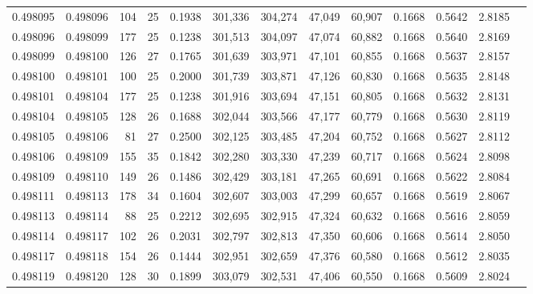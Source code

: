 \begin{tabular}{rrrrrrrrrrrrr}
0.498095 & 0.498096 & 104 &  25 &                                     0.1938 & 301,336 & 304,274 &  47,049 &  60,907 & 0.1668 & 0.5642 & 2.8185 \\
0.498096 & 0.498099 & 177 &  25 &                                     0.1238 & 301,513 & 304,097 &  47,074 &  60,882 & 0.1668 & 0.5640 & 2.8169 \\
0.498099 & 0.498100 & 126 &  27 &                                     0.1765 & 301,639 & 303,971 &  47,101 &  60,855 & 0.1668 & 0.5637 & 2.8157 \\
0.498100 & 0.498101 & 100 &  25 &                                     0.2000 & 301,739 & 303,871 &  47,126 &  60,830 & 0.1668 & 0.5635 & 2.8148 \\
0.498101 & 0.498104 & 177 &  25 &                                     0.1238 & 301,916 & 303,694 &  47,151 &  60,805 & 0.1668 & 0.5632 & 2.8131 \\
0.498104 & 0.498105 & 128 &  26 &                                     0.1688 & 302,044 & 303,566 &  47,177 &  60,779 & 0.1668 & 0.5630 & 2.8119 \\
0.498105 & 0.498106 &  81 &  27 &                                     0.2500 & 302,125 & 303,485 &  47,204 &  60,752 & 0.1668 & 0.5627 & 2.8112 \\
0.498106 & 0.498109 & 155 &  35 &                                     0.1842 & 302,280 & 303,330 &  47,239 &  60,717 & 0.1668 & 0.5624 & 2.8098 \\
0.498109 & 0.498110 & 149 &  26 &                                     0.1486 & 302,429 & 303,181 &  47,265 &  60,691 & 0.1668 & 0.5622 & 2.8084 \\
0.498111 & 0.498113 & 178 &  34 &                                     0.1604 & 302,607 & 303,003 &  47,299 &  60,657 & 0.1668 & 0.5619 & 2.8067 \\
0.498113 & 0.498114 &  88 &  25 &                                     0.2212 & 302,695 & 302,915 &  47,324 &  60,632 & 0.1668 & 0.5616 & 2.8059 \\
0.498114 & 0.498117 & 102 &  26 &                                     0.2031 & 302,797 & 302,813 &  47,350 &  60,606 & 0.1668 & 0.5614 & 2.8050 \\
0.498117 & 0.498118 & 154 &  26 &                                     0.1444 & 302,951 & 302,659 &  47,376 &  60,580 & 0.1668 & 0.5612 & 2.8035 \\
0.498119 & 0.498120 & 128 &  30 &                                     0.1899 & 303,079 & 302,531 &  47,406 &  60,550 & 0.1668 & 0.5609 & 2.8024 \\

\end{tabular}
